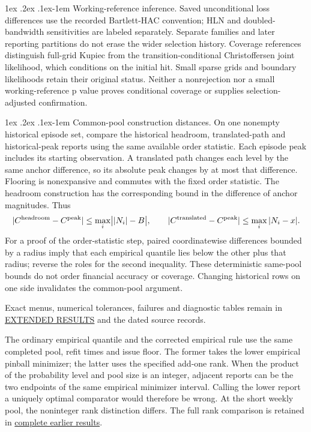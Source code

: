 \documentclass[10pt,a4paper]{article}
\makeatletter
\renewcommand\paragraph{\@startsection{paragraph}{4}{\z@}%
  {1ex \@plus .2ex \@minus .1ex}{-1em}%
  {\normalfont\normalsize\bfseries}}
\makeatother
\begin{document}
\paragraph{Working-reference inference.}
Saved unconditional loss differences use the recorded Bartlett-HAC convention;
HLN and doubled-bandwidth sensitivities are labeled separately. Separate
families and later reporting partitions do not erase the wider selection
history. Coverage references distinguish full-grid Kupiec from the
transition-conditional Christoffersen joint likelihood, which conditions on
the initial hit. Small sparse grids and boundary likelihoods retain their
original status. Neither a nonrejection nor a small working-reference p value
proves conditional coverage or supplies selection-adjusted confirmation.

\paragraph{Common-pool construction distances.}
On one nonempty historical episode set, compare the historical headroom,
translated-path and historical-peak reports using the same available order
statistic. Each episode peak includes its starting observation. A translated
path changes each level by the same anchor difference, so its absolute peak
changes by at most that difference. Flooring is nonexpansive and commutes with
the fixed order statistic. The headroom construction has the corresponding
bound in the difference of anchor magnitudes. Thus
\[
|C^{\rm headroom}-C^{\rm peak}|\le\max_i\bigl||N_i|-B\bigr|,\qquad
|C^{\rm translated}-C^{\rm peak}|\le\max_i|N_i-x|.
\]
For a proof of the order-statistic step, paired coordinatewise differences
bounded by a radius imply that each empirical quantile lies below the other
plus that radius; reverse the roles for the second inequality. These
deterministic same-pool bounds do not order financial accuracy or coverage.
Changing historical rows on one side invalidates the common-pool argument.

Exact menus, numerical tolerances, failures and diagnostic tables remain in
\href{https://github.com/ByronLi0207/financial-mathematics-paper-20261020/blob/revision-v7-final/EXTENDED_RESULTS.md}{EXTENDED RESULTS} and the dated source records.

The ordinary empirical quantile and the corrected empirical rule use
the same completed pool, refit times and issue floor. The former takes the
lower empirical pinball minimizer; the latter uses the specified add-one rank.
When the product of the probability level and pool size is an integer, adjacent reports can be the two endpoints of the same empirical minimizer interval. Calling the lower report a
uniquely optimal comparator would therefore be wrong. At the short weekly pool,
the noninteger rank distinction differs.
The full rank comparison is retained in \href{https://github.com/ByronLi0207/financial-mathematics-paper-20261020/blob/submission-final/EXTENDED_RESULTS.md#asmbi-extended-s08}{complete earlier results}.
\end{document}

